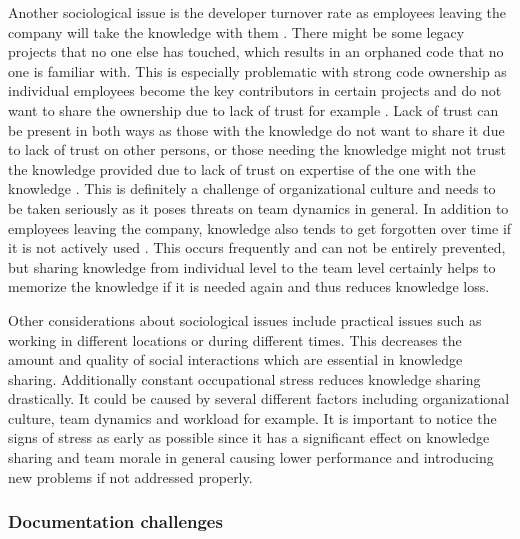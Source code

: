 Another sociological issue is the developer turnover rate as employees leaving the company will take the knowledge with them \citep{Ersoy2015}. There might be some
legacy projects that no one else has touched, which results in an orphaned code that no one is familiar with. This is especially problematic with strong code ownership
as individual employees become the key contributors in certain projects and do not want to share the ownership due to lack of trust for example \citep{Ersoy2015}.
Lack of trust can be present in both ways as those with the knowledge do not want to share it due to lack of trust on other persons, or those needing the knowledge
might not trust the knowledge provided due to lack of trust on expertise of the one with the knowledge \citep{Dalkir2013}. This is definitely a challenge of
organizational culture and needs to be taken seriously as it poses threats on team dynamics in general.
In addition to employees leaving the company, knowledge also tends to get forgotten over time if it is not actively used \citep{Basri2011}. This occurs frequently
and can not be entirely prevented, but sharing knowledge from individual level to the team level certainly helps to memorize the knowledge if it is needed again and thus reduces
knowledge loss.

Other considerations about sociological issues include practical issues such as working in different locations or during different times. This
decreases the amount and quality of social interactions which are essential in knowledge sharing. Additionally constant occupational stress reduces knowledge
sharing drastically. It could be caused by several different factors including organizational culture, team dynamics and workload for example. It
is important to notice the signs of stress as early as possible since it has a significant effect on knowledge sharing and team morale in general causing
lower performance and introducing new problems if not addressed properly. \citep{Ersoy2015}

\subsubsection*{Documentation challenges}


